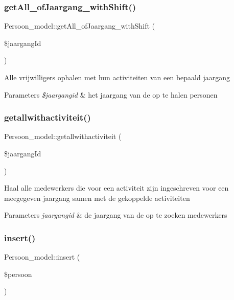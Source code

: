 \subsubsection{\texorpdfstring{get\+All\+\_\+of\+Jaargang\+\_\+with\+Shift()}{getAll\_ofJaargang\_withShift()}}
{\footnotesize\ttfamily Persoon\+\_\+model\+::get\+All\+\_\+of\+Jaargang\+\_\+with\+Shift (\begin{DoxyParamCaption}\item[{}]{\$jaargang\+Id }\end{DoxyParamCaption})}

Alle vrijwilligers ophalen met hun activiteiten van een bepaald jaargang 
\begin{DoxyParams}{Parameters}
{\em \$jaargangid} & het jaargang van de op te halen personen \\
\hline
\end{DoxyParams}
\mbox{\label{class_persoon__model_a72d8c06b34d07ca558ec53c759996b60}} 
\subsubsection{\texorpdfstring{getallwithactiviteit()}{getallwithactiviteit()}}
{\footnotesize\ttfamily Persoon\+\_\+model\+::getallwithactiviteit (\begin{DoxyParamCaption}\item[{}]{\$jaargang\+Id }\end{DoxyParamCaption})}

Haal alle medewerkers die voor een activiteit zijn ingeschreven voor een meegegeven jaargang samen met de gekoppelde activiteiten 
\begin{DoxyParams}{Parameters}
{\em jaargangid} & de jaargang van de op te zoeken medewerkers \\
\hline
\end{DoxyParams}
\mbox{\label{class_persoon__model_a2c311e5cb508141c1bae2566b3169615}} 
\subsubsection{\texorpdfstring{insert()}{insert()}}
{\footnotesize\ttfamily Persoon\+\_\+model\+::insert (\begin{DoxyParamCaption}\item[{}]{\$persoon }\end{DoxyParamCaption})}


